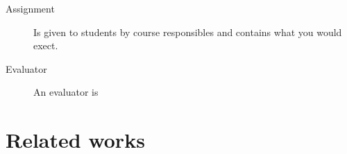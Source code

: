 \begin{description}
  \item[Assignment] Is given to students by course responsibles and
    contains what you would exect.
  \item[Evaluator] An evaluator is
\end{description}

\section{Related works}




